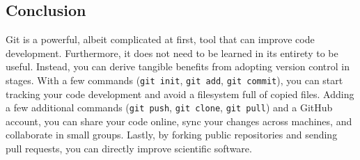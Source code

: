 \subsection{Conclusion}

Git is a powerful, albeit complicated at first, tool that can improve code development.
Furthermore, it does not need to be learned in its entirety to be useful.
Instead, you can derive tangible benefits from adopting version control in stages.
With a few commands (\verb|git init|, \verb|git add|, \verb|git commit|), you can start tracking your code development and avoid a filesystem full of copied files.
Adding a few additional commands (\verb|git push|, \verb|git clone|, \verb|git pull|) and a GitHub account, you can share your code online, sync your changes across machines, and collaborate in small groups.
Lastly, by forking public repositories and sending pull requests, you can directly improve scientific software.
